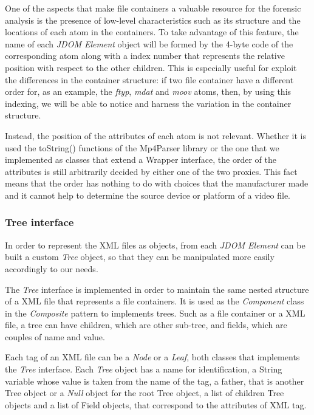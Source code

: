 One of the aspects that make file containers a valuable resource for the forensic analysis is the presence of low-level characteristics such as its structure and the locations of each atom in the containers. To take advantage of this feature, the name of each \emph{JDOM Element} object will be formed by the 4-byte code of the corresponding atom along with a index number that represents the relative position with respect to the other children. This is especially useful for exploit the differences in the container structure: if two file container have a different order for, as an example, the \emph{ftyp}, \emph{mdat} and \emph{moov} atoms, then, by using this indexing, we will be able to notice and harness the variation in the container structure.

Instead, the position of the attributes of each atom is not relevant. Whether it is used the toString() functions of the Mp4Parser library or the one that we implemented as classes that extend a Wrapper interface, the order of the attributes is still arbitrarily decided by either one of the two proxies. This fact means that the order has nothing to do with choices that the manufacturer made and it cannot help to determine the source device or platform of a video file.

\subsubsection{Tree interface}

In order to represent the XML files as objects, from each \emph{JDOM Element} can be built a custom \emph{Tree} object, so that they can be manipulated more easily accordingly to our needs.

The \emph{Tree} interface is implemented in order to maintain the same nested structure of a XML file that represents a file containers. It is used as the \emph{Component} class in the \emph{Composite} pattern to implements trees. Such as a file container or a XML file, a tree can have children, which are other sub-tree, and fields, which are couples of name and value.

Each tag of an XML file can be a \emph{Node} or a \emph{Leaf}, both classes that implements the \emph{Tree} interface. Each \emph{Tree} object has a name for identification, a String variable whose value is taken from the name of the tag, a father, that is another Tree object or a \emph{Null} object for the root Tree object, a list of children Tree objects and a list of Field objects, that correspond to the attributes of XML tag.

